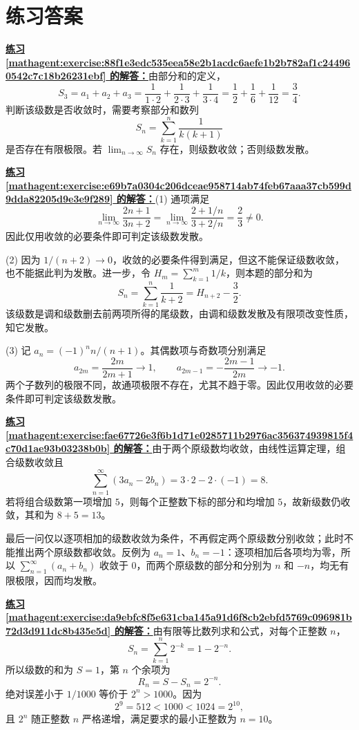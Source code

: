 \documentclass[UTF8,fontset=fandol,11pt]{ctexart}
\begin{document}
\section*{练习答案}
\par\noindent\textbf{\hyperref[mathagent:exercise:88f1e3edc535eea58e2b1acdc6aefe1b2b782af1c244960542c7c18b26231ebf]{练习 \ref*{mathagent:exercise:88f1e3edc535eea58e2b1acdc6aefe1b2b782af1c244960542c7c18b26231ebf} 的解答：}}由部分和的定义，
\[
S_3=a_1+a_2+a_3
=\frac{1}{1\cdot2}+\frac{1}{2\cdot3}+\frac{1}{3\cdot4}
=\frac12+\frac16+\frac1{12}
=\frac34.
\]
判断该级数是否收敛时，需要考察部分和数列
\[
S_n=\sum_{k=1}^{n}\frac{1}{k(k+1)}
\]
是否存在有限极限。若 $\lim_{n\to\infty}S_n$ 存在，则级数收敛；否则级数发散。\par
\par\noindent\textbf{\hyperref[mathagent:exercise:e69b7a0304c206dceae958714ab74feb67aaa37cb599d9dda82205d9e3e9f289]{练习 \ref*{mathagent:exercise:e69b7a0304c206dceae958714ab74feb67aaa37cb599d9dda82205d9e3e9f289} 的解答：}}(1) 通项满足
\[
\lim_{n\to\infty}\frac{2n+1}{3n+2}
=\lim_{n\to\infty}\frac{2+1/n}{3+2/n}=\frac23\ne0.
\]
因此仅用收敛的必要条件即可判定该级数发散。

(2) 因为 $1/(n+2)\to0$，收敛的必要条件得到满足，但这不能保证级数收敛，也不能据此判为发散。进一步，令 $H_m=\sum_{k=1}^{m}1/k$，则本题的部分和为
\[
S_n=\sum_{k=1}^{n}\frac1{k+2}=H_{n+2}-\frac32.
\]
该级数是调和级数删去前两项所得的尾级数，由调和级数发散及有限项改变性质，知它发散。

(3) 记 $a_n=(-1)^n n/(n+1)$。其偶数项与奇数项分别满足
\[
a_{2m}=\frac{2m}{2m+1}\longrightarrow1,\qquad
a_{2m-1}=-\frac{2m-1}{2m}\longrightarrow-1.
\]
两个子数列的极限不同，故通项极限不存在，尤其不趋于零。因此仅用收敛的必要条件即可判定该级数发散。\par
\par\noindent\textbf{\hyperref[mathagent:exercise:fae67726e3f6b1d71e0285711b2976ac356374939815f4c70d1ae93b03238b0b]{练习 \ref*{mathagent:exercise:fae67726e3f6b1d71e0285711b2976ac356374939815f4c70d1ae93b03238b0b} 的解答：}}由于两个原级数均收敛，由线性运算定理，组合级数收敛且
\[
\sum_{n=1}^{\infty}(3a_n-2b_n)=3\cdot2-2\cdot(-1)=8.
\]
若将组合级数第一项增加 $5$，则每个正整数下标的部分和均增加 $5$，故新级数仍收敛，其和为 $8+5=13$。

最后一问仅以逐项相加的级数收敛为条件，不再假定两个原级数分别收敛；此时不能推出两个原级数都收敛。反例为 $a_n=1$、$b_n=-1$：逐项相加后各项均为零，所以 $\sum_{n=1}^{\infty}(a_n+b_n)$ 收敛于 $0$，而两个原级数的部分和分别为 $n$ 和 $-n$，均无有限极限，因而均发散。\par
\par\noindent\textbf{\hyperref[mathagent:exercise:da9ebfc8f5e631cba145a91d6f8cb2ebfd5769c096981b72d3d911dc8b435e5d]{练习 \ref*{mathagent:exercise:da9ebfc8f5e631cba145a91d6f8cb2ebfd5769c096981b72d3d911dc8b435e5d} 的解答：}}由有限等比数列求和公式，对每个正整数 $n$，
\[
S_n=\sum_{k=1}^{n}2^{-k}=1-2^{-n}.
\]
所以级数的和为 $S=1$，第 $n$ 个余项为
\[
R_n=S-S_n=2^{-n}.
\]
绝对误差小于 $1/1000$ 等价于 $2^n>1000$。因为
\[
2^9=512<1000<1024=2^{10},
\]
且 $2^n$ 随正整数 $n$ 严格递增，满足要求的最小正整数为 $n=10$。
\end{document}
